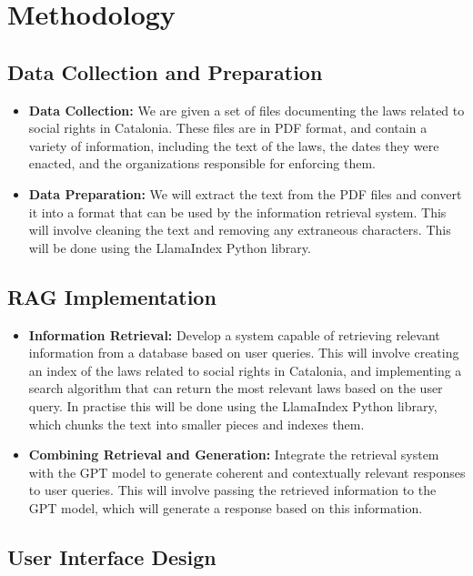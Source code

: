 \documentclass[a4paper,12pt,twoside]{ThesisStyle}
\begin{document}
\section{Methodology}

\subsection{Data Collection and Preparation}
\label{subsec:data}

\begin{itemize}
  \item \textbf{Data Collection:} We are given a set of files documenting the laws related to social rights in Catalonia. These files are in PDF format, and contain a variety of information, including the text of the laws, the dates they were enacted, and the organizations responsible for enforcing them.
  \item \textbf{Data Preparation:} We will extract the text from the PDF files and convert it into a format that can be used by the information retrieval system. This will involve cleaning the text and removing any extraneous characters. This will be done using the LlamaIndex Python library.
\end{itemize}

\subsection{RAG Implementation}
\label{subsec:rag-implementation}

\begin{itemize}
  \item \textbf{Information Retrieval:} Develop a system capable of retrieving relevant information from a database based on user queries. This will involve creating an index of the laws related to social rights in Catalonia, and implementing a search algorithm that can return the most relevant laws based on the user query. In practise this will be done using the LlamaIndex Python library, which chunks the text into smaller pieces and indexes them.
  \item \textbf{Combining Retrieval and Generation:} Integrate the retrieval system with the GPT model to generate coherent and contextually relevant responses to user queries. This will involve passing the retrieved information to the GPT model, which will generate a response based on this information.
\end{itemize}

\subsection{User Interface Design}
\label{subsec:ui-design}
\end{document}
